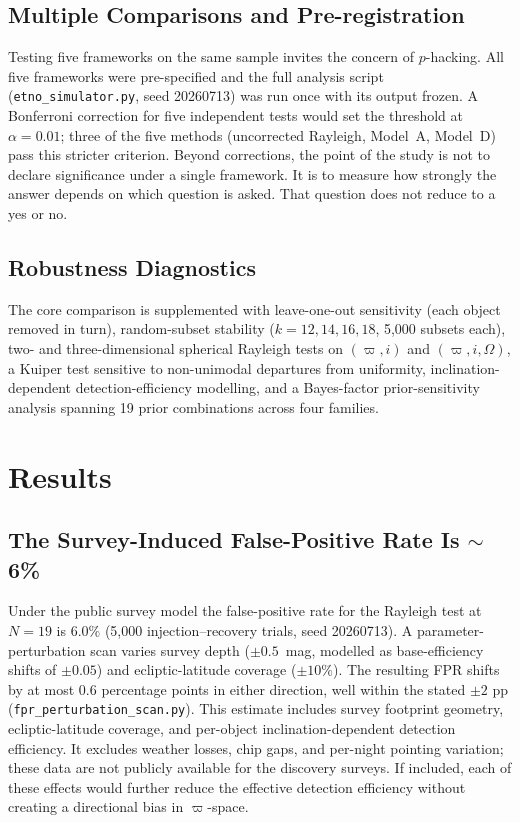\documentclass[usenatbib]{mnras}
\begin{document}
\subsection{Multiple Comparisons and Pre-registration}

Testing five frameworks on the same sample invites the concern of $p$-hacking. All five frameworks were pre-specified and the full analysis script (\texttt{etno\_simulator.py}, seed 20260713) was run once with its output frozen. A Bonferroni correction for five independent tests would set the threshold at $\alpha = 0.01$; three of the five methods (uncorrected Rayleigh, Model~A, Model~D) pass this stricter criterion. Beyond corrections, the point of the study is not to declare significance under a single framework. It is to measure how strongly the answer depends on which question is asked. That question does not reduce to a yes or no.

\subsection{Robustness Diagnostics}

The core comparison is supplemented with leave-one-out sensitivity (each object removed in turn), random-subset stability ($k=12,14,16,18$, 5,000 subsets each), two- and three-dimensional spherical Rayleigh tests on $(\varpi, i)$ and $(\varpi, i, \Omega)$, a Kuiper test sensitive to non-unimodal departures from uniformity, inclination-dependent detection-efficiency modelling, and a Bayes-factor prior-sensitivity analysis spanning 19 prior combinations across four families.

\section{Results}

\subsection{The Survey-Induced False-Positive Rate Is $\sim$6\%}

Under the public survey model the false-positive rate for the Rayleigh test at $N=19$ is $6.0\%$ (5,000 injection--recovery trials, seed 20260713). A parameter-perturbation scan varies survey depth ($\pm0.5$~mag, modelled as base-efficiency shifts of $\pm0.05$) and ecliptic-latitude coverage ($\pm10\%$). The resulting FPR shifts by at most 0.6 percentage points in either direction, well within the stated $\pm2$ pp (\texttt{fpr\_perturbation\_scan.py}). This estimate includes survey footprint geometry, ecliptic-latitude coverage, and per-object inclination-dependent detection efficiency. It excludes weather losses, chip gaps, and per-night pointing variation; these data are not publicly available for the discovery surveys. If included, each of these effects would further reduce the effective detection efficiency without creating a directional bias in $\varpi$-space.
\end{document}
